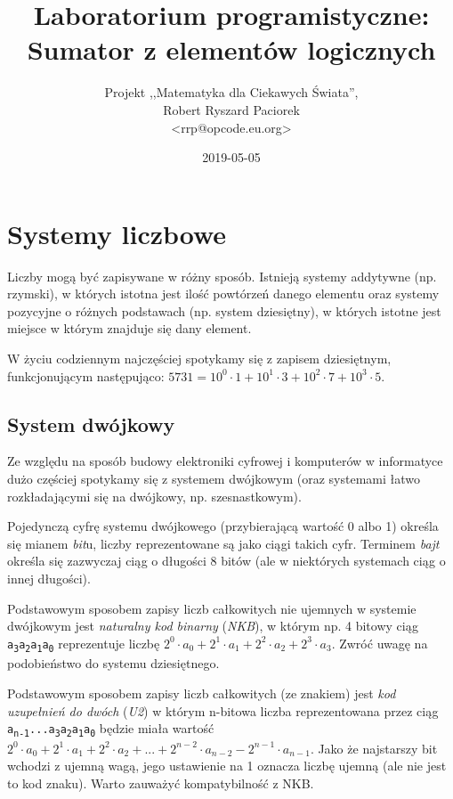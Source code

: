 \documentclass{pdfBooklets}
\title{Laboratorium programistyczne: Sumator z elementów logicznych}
\author{%
	Projekt ,,Matematyka dla Ciekawych Świata'',\\
	Robert Ryszard Paciorek\\\normalsize\ttfamily <rrp@opcode.eu.org>
}
\date  {2019-05-05}
\begin{document}
\maketitle

\section{Systemy liczbowe}

Liczby mogą być zapisywane w różny sposób. Istnieją systemy addytywne (np. rzymski), w których istotna jest ilość powtórzeń danego elementu oraz systemy pozycyjne o różnych podstawach (np. system dziesiętny), w których istotne jest miejsce w którym znajduje się dany element.

W życiu codziennym najczęściej spotykamy się z zapisem dziesiętnym, funkcjonującym następująco: $5731 = 10^0 \cdot 1 + 10^1 \cdot 3 + 10^2 \cdot 7 + 10^3 \cdot 5$.

\subsection{System dwójkowy}

Ze względu na sposób budowy elektroniki cyfrowej i komputerów w informatyce dużo częściej spotykamy się z systemem dwójkowym (oraz systemami łatwo rozkładającymi się na dwójkowy, np. szesnastkowym).

Pojedynczą cyfrę systemu dwójkowego (przybierającą wartość 0 albo 1) określa się mianem \emph{bit}u, liczby reprezentowane są jako ciągi takich cyfr. Terminem \emph{bajt} określa się zazwyczaj ciąg o długości 8 bitów (ale w niektórych systemach ciąg o innej długości).

Podstawowym sposobem zapisy liczb całkowitych nie ujemnych w systemie dwójkowym jest \emph{naturalny kod binarny} (\emph{NKB}), w którym np. 4 bitowy ciąg {\tt a\textsubscript{3}a\textsubscript{2}a\textsubscript{1}a\textsubscript{0}} reprezentuje liczbę $2^0 \cdot a_0 + 2^1 \cdot a_1 + 2^2 \cdot a_2 + 2^3 \cdot a_3$. Zwróć uwagę na podobieństwo do systemu dziesiętnego.

Podstawowym sposobem zapisy liczb całkowitych (ze znakiem) jest \emph{kod uzupełnień do dwóch} (\emph{U2}) w którym n-bitowa liczba reprezentowana przez ciąg {\tt a\textsubscript{n-1}...a\textsubscript{3}a\textsubscript{2}a\textsubscript{1}a\textsubscript{0}} będzie miała wartość $2^0 \cdot a_0 + 2^1 \cdot a_1 + 2^2 \cdot a_2 + ... + 2^{n-2} \cdot a_{n-2} - 2^{n-1} \cdot a_{n-1}$. Jako że najstarszy bit wchodzi z ujemną wagą, jego ustawienie na 1 oznacza liczbę ujemną (ale nie jest to kod znaku). Warto zauważyć kompatybilność z NKB.
\end{document}
